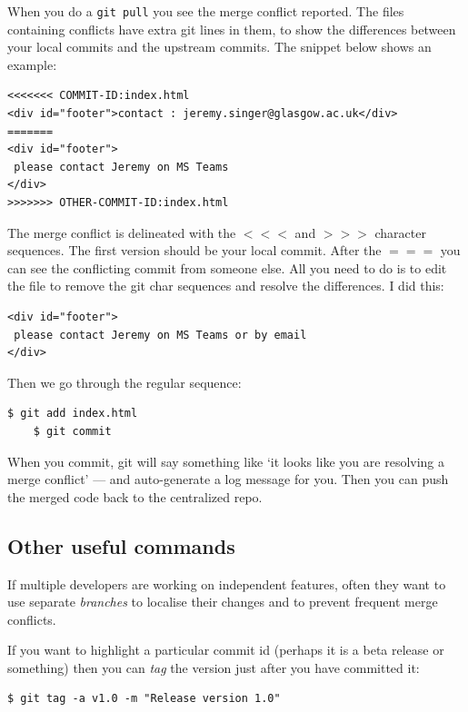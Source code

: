 \documentclass{article}
\begin{document}
When you do a \texttt{git pull} you see the merge conflict reported.
The files containing conflicts have extra git lines in them, to show the
differences between your local commits and the upstream commits. The snippet below shows an example:
\begin{verbatim}
<<<<<<< COMMIT-ID:index.html
<div id="footer">contact : jeremy.singer@glasgow.ac.uk</div>
=======
<div id="footer">
 please contact Jeremy on MS Teams
</div>
>>>>>>> OTHER-COMMIT-ID:index.html
\end{verbatim}

The merge conflict is delineated with the $<<<$ and $>>>$ character sequences. The first version should be your local commit. After the $===$
you can see the conflicting commit from someone else. All you need to
do is to edit the file to remove the git char sequences and resolve the
differences. I did this:

\begin{verbatim}
<div id="footer">
 please contact Jeremy on MS Teams or by email
</div>
\end{verbatim}

Then we go through the regular sequence:


\begin{lstlisting}[style=BashInputStyle]
    $ git add index.html
    $ git commit
\end{lstlisting}

When you commit, git will say something like `it looks like you are resolving a
merge conflict' --- and auto-generate a log message for you. Then you can push the merged code back to the centralized repo.


\subsection*{Other useful commands}

If multiple developers are working on independent features, often they want
to use separate \emph{branches} to localise their changes and to prevent
frequent merge conflicts.

If you want to highlight a particular commit id (perhaps it is a beta release or something) then you can \emph{tag} the version just after you have committed it:

\begin{lstlisting}[style=BashInputStyle]
    $ git tag -a v1.0 -m "Release version 1.0"
\end{lstlisting}
\end{document}
